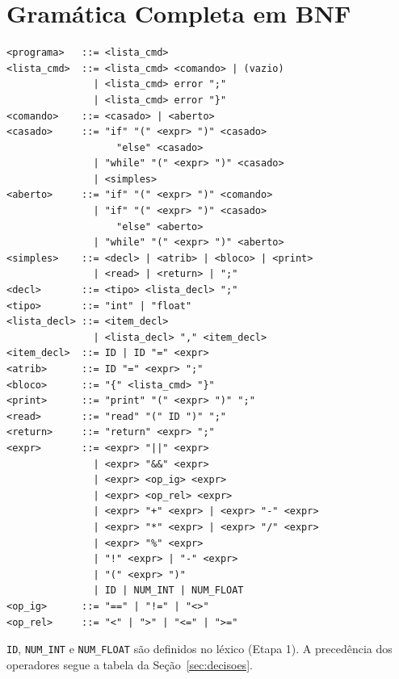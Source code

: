 \documentclass[sigconf,nonacm]{acmart}
\begin{document}
\section{Gramática Completa em BNF}\label{sec:bnf}
\begin{small}
\begin{verbatim}
<programa>   ::= <lista_cmd>
<lista_cmd>  ::= <lista_cmd> <comando> | (vazio)
               | <lista_cmd> error ";"
               | <lista_cmd> error "}"
<comando>    ::= <casado> | <aberto>
<casado>     ::= "if" "(" <expr> ")" <casado>
                   "else" <casado>
               | "while" "(" <expr> ")" <casado>
               | <simples>
<aberto>     ::= "if" "(" <expr> ")" <comando>
               | "if" "(" <expr> ")" <casado>
                   "else" <aberto>
               | "while" "(" <expr> ")" <aberto>
<simples>    ::= <decl> | <atrib> | <bloco> | <print>
               | <read> | <return> | ";"
<decl>       ::= <tipo> <lista_decl> ";"
<tipo>       ::= "int" | "float"
<lista_decl> ::= <item_decl>
               | <lista_decl> "," <item_decl>
<item_decl>  ::= ID | ID "=" <expr>
<atrib>      ::= ID "=" <expr> ";"
<bloco>      ::= "{" <lista_cmd> "}"
<print>      ::= "print" "(" <expr> ")" ";"
<read>       ::= "read" "(" ID ")" ";"
<return>     ::= "return" <expr> ";"
<expr>       ::= <expr> "||" <expr>
               | <expr> "&&" <expr>
               | <expr> <op_ig> <expr>
               | <expr> <op_rel> <expr>
               | <expr> "+" <expr> | <expr> "-" <expr>
               | <expr> "*" <expr> | <expr> "/" <expr>
               | <expr> "%" <expr>
               | "!" <expr> | "-" <expr>
               | "(" <expr> ")"
               | ID | NUM_INT | NUM_FLOAT
<op_ig>      ::= "==" | "!=" | "<>"
<op_rel>     ::= "<" | ">" | "<=" | ">="
\end{verbatim}
\end{small}
\noindent\texttt{ID}, \texttt{NUM\_INT} e \texttt{NUM\_FLOAT} são definidos no léxico
(Etapa 1). A precedência dos operadores segue a tabela da Seção~\ref{sec:decisoes}.
\end{document}
